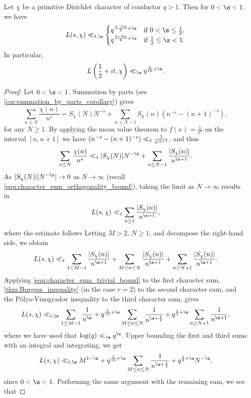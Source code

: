     \begin{theorem}\label{thm:Burgess_bound_conductor_aspect_Dirichlet}
      Let $\chi$ be a primitive Dirichlet character of conductor $q > 1$. Then for $0 < \s < 1$, we have
      \[
        L(s,\chi) \ll_{t,\e} \begin{cases} q^{\frac{4-5\s}{8}+\e} & \text{if $0 < \s \le \frac{1}{2}$}, \\ q^{\frac{3-3\s}{8}+\e} & \text{if $\frac{1}{2} \le \s < 1$}. \end{cases}
      \]
      In particular,
      \[
        L\left(\frac{1}{2}+it,\chi\right) \ll_{\e} q^{\frac{3}{16}+\e}. 
      \]
    \end{theorem}
    \begin{proof}
      Let $0 < \s < 1$. Summation by parts (see \cref{cor:summation_by_parts_corollary}) gives
      \[
        \sum_{n \le N}\frac{\chi(n)}{n^{s}} = S_{\chi}(N)N^{-s}+\sum_{n \le N-1}S_{\chi}(n)(n^{-s}-(n+1)^{-s}),
      \]
      for any $N \ge 1$. By applying the mean value theorem to $f(x) = \frac{1}{x^{s}}$ on the interval $[n,n+1]$ we have $(n^{-s}-(n+1)^{-s}) \ll_{t} \frac{1}{n^{\s+1}}$, and thus
      \[
        \sum_{n \le N}\frac{\chi(n)}{n^{s}} \ll_{t} |S_{\chi}(N)|N^{-\s}+\sum_{n \le N-1}\frac{|S_{\chi}(n)|}{n^{\s+1}}.
      \]
      As $|S_{\chi}(N)||N^{-\s}| \to 0$ as $N \to \infty$ (recall \cref{equ:character_sum_orthogonality_bound}), taking the limit as $N \to \infty$ results in
      \[
        L(s,\chi) \ll_{t} \sum_{n \ge 1}\frac{|S_{\chi}(n)|}{n^{\s+1}},
      \]
      where the estimate follows  Letting $M > 2$, $N \ge 1$, and decompose the right-hand side, we obtain
      \[
        L(s,\chi) \ll_{t} \sum_{1 \le M-1}\frac{|S_{\chi}(n)|}{n^{\s+1}}+\sum_{M \le n \le N}\frac{|S_{\chi}(n)|}{n^{\s+1}}+\sum_{n \ge N+1}\frac{|S_{\chi}(n)|}{n^{\s+1}}.
      \]
      Applying \cref{equ:character_sum_trivial_bound} to the first character sum, \cref{thm:Burgess_inequality} (in the case $r = 2$) to the second character sum, and the P\'olya-Vinogradov inequality to the third character sum, gives
      \[
        L(s,\chi) \ll_{t,\e} \sum_{1 \le M-1}\frac{1}{n^{\s}}+q^{\frac{3}{16}+\e}\sum_{M \le n \le N}\frac{1}{n^{\s+\frac{1}{2}}}+q^{\frac{1}{2}+\e}\sum_{n \ge N+1}\frac{1}{n^{\s+1}},
      \]
      where we have used that $\log(q) \ll_{\e} q^{\e}$. Upper bounding the first and third sums with an integral and integrating, we get
      \[
        L(s,\chi) \ll_{t,\e} M^{1-\s}+q^{\frac{3}{16}+\e}\sum_{M \le n \le N}\frac{1}{n^{\s+\frac{1}{2}}}+q^{\frac{1}{2}+\e}N^{-\s},
      \]
      since $0 < \s < 1$. Performing the same argument with the remaining sum, we see that

\end{proof}
